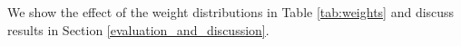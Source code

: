 \documentclass[conference]{IEEEtran}
\begin{document}
We show the effect of the weight distributions in Table \ref{tab:weights} and discuss results in Section \ref{evaluation_and_discussion}.


%
\end{document}
